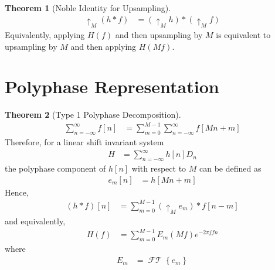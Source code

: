\documentclass[titlepage, fleqn, a4paper, 12pt, twoside]{article}
\theoremstyle{definition}
\theoremstyle{theorem}
\newtheorem{theorem}{Theorem}
\DeclareMathOperator{\FT}{\mathcal{FT}}
\def\upsample#1{\uparrow_{#1}}
\begin{document}
\begin{theorem}[Noble Identity for Upsampling]
	\begin{align*}
		\upsample{M} (h \ast f) &= \left( \upsample{M} h \right) \ast \left( \upsample{M} f \right)
	\end{align*}
	Equivalently, applying $H(f)$ and then upsampling by $M$ is equivalent to upsampling by $M$ and then applying $H(M f)$.
	\label{thm:Noble_identity_for_upsampling}
\end{theorem}

\section{Polyphase Representation}

\begin{theorem}[Type 1 Polyphase Decomposition]
	\begin{align*}
		\sum\limits_{n = -\infty}^{\infty} f[n] &= \sum\limits_{m = 0}^{M - 1} \sum\limits_{n = -\infty}^{\infty} f[M n + m]
	\end{align*}
	Therefore, for a linear shift invariant system
	\begin{align*}
		H &= \sum\limits_{n = -\infty}^{\infty} h[n] D_n
	\end{align*}
	the polyphase component of $h[n]$ with respect to $M$ can be defined as
	\begin{align*}
		e_m[n] &= h[M n + m]
	\end{align*}
	Hence,
	\begin{align*}
		(h \ast f)[n] &= \sum\limits_{m = 0}^{M - 1} (\upsample{M} e_m) \ast f[n - m]
	\end{align*}
	and equivalently,
	\begin{align*}
		H(f) &= \sum\limits_{m = 0}^{M - 1} E_m(M f) e^{-2 \pi j f n}
	\end{align*}
	where
	\begin{align*}
		E_m &= \FT\left\{ e_m \right\}
	\end{align*}
	\label{thm:type_1_polyphase_decomposition}
\end{theorem}
\end{document}
